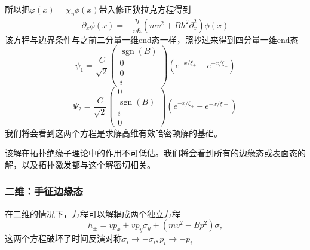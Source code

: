 \documentclass{article}
\numberwithin{equation}{subsection}
\begin{document}
所以把$\varphi(x)=\chi_\eta\phi(x)$带入修正狄拉克方程得到
\begin{equation}
    \partial_x\phi(x)=-\frac{\eta}{v\hbar}(mv^2+B\hbar^2\partial_x^2)\phi(x)
\end{equation}
该方程与边界条件与之前二分量一维end态一样，照抄过来得到四分量一维end态
\begin{equation}
    \psi_{1}=\frac{C}{\sqrt{2}}\left(\begin{array}{c}
        \operatorname{sgn}(B) \\
        0 \\
        0 \\
        i
        \end{array}\right)\left(e^{-x / \xi_{+}}-e^{-x / \xi_{-}}\right)
\end{equation}
\begin{equation}
    \Psi_{2}=\frac{C}{\sqrt{2}}\left(\begin{array}{c}
        0 \\
        \operatorname{sgn}(B) \\
        i \\
        0
        \end{array}\right)\left(e^{-x / \xi_{+}}-e^{-x / \xi-}\right)
\end{equation}
我们将会看到这两个方程是求解高维有效哈密顿解的基础。

该解在拓扑绝缘子理论中的作用不可低估。我们将会看到所有的边缘态或表面态的解，以及拓扑激发都与这个解密切相关。
\subsubsection{二维：手征边缘态}
在二维的情况下，方程可以解耦成两个独立方程
\begin{equation}
    h_\pm=vp_x\pm vp_y\sigma_y+(mv^2-Bp^2)\sigma_z
\end{equation}
这两个方程破坏了时间反演对称$\sigma_i\rightarrow-\sigma_i,p_i\rightarrow-p_i$
\end{document}
